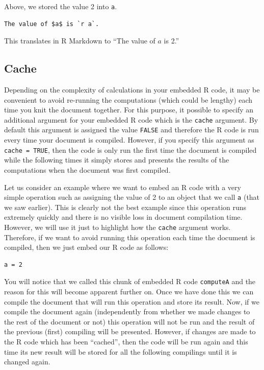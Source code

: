 \documentclass[]{book}
\theoremstyle{definition}
\theoremstyle{definition}
\theoremstyle{remark}
\begin{document}
Above, we stored the value 2 into \texttt{a}.

\begin{verbatim}
The value of $a$ is `r a`. 
\end{verbatim}

This translates in R Markdown to ``The value of \(a\) is 2.''

\subsection*{Cache}\label{cache}

Depending on the complexity of calculations in your embedded R code, it
may be convenient to avoid re-running the computations (which could be
lengthy) each time you knit the document together. For this purpose, it
possible to specify an additional argument for your embedded R code
which is the \texttt{cache} argument. By default this argument is
assigned the value \texttt{FALSE} and therefore the R code is run every
time your document is compiled. However, if you specify this argument as
\texttt{cache\ =\ TRUE}, then the code is only run the first time the
document is compiled while the following times it simply stores and
presents the results of the computations when the document was first
compiled.

Let us consider an example where we want to embed an R code with a very
simple operation such as assigning the value of 2 to an object that we
call \texttt{a} (that we saw earlier). This is clearly not the best
example since this operation runs extremely quickly and there is no
visible loss in document compilation time. However, we will use it just
to highlight how the \texttt{cache} argument works. Therefore, if we
want to avoid running this operation each time the document is compiled,
then we just embed our R code as follows:

\begin{verbatim}
a = 2
\end{verbatim}

You will notice that we called this chunk of embedded R code
\texttt{computeA} and the reason for this will become apparent further
on. Once we have done this we can compile the document that will run
this operation and store its result. Now, if we compile the document
again (independently from whether we made changes to the rest of the
document or not) this operation will not be run and the result of the
previous (first) compiling will be presented. However, if changes are
made to the R code which has been ``cached'', then the code will be run
again and this time its new result will be stored for all the following
compilings until it is changed again.
\end{document}
